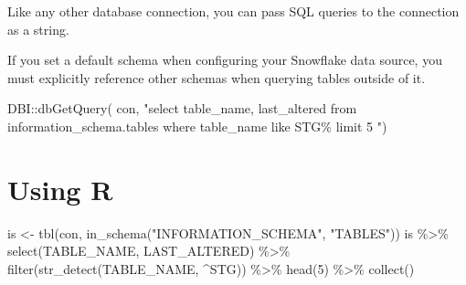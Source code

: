 \documentclass[
  letterpaper,
  DIV=11,
  numbers=noendperiod]{scrreprt}
\newenvironment{Shaded}{\begin{snugshade}}{\end{snugshade}}
\newcommand{\DecValTok}[1]{\textcolor[rgb]{0.68,0.00,0.00}{#1}}
\newcommand{\FunctionTok}[1]{\textcolor[rgb]{0.28,0.35,0.67}{#1}}
\newcommand{\NormalTok}[1]{\textcolor[rgb]{0.00,0.23,0.31}{#1}}
\newcommand{\OtherTok}[1]{\textcolor[rgb]{0.00,0.23,0.31}{#1}}
\newcommand{\SpecialCharTok}[1]{\textcolor[rgb]{0.37,0.37,0.37}{#1}}
\newcommand{\StringTok}[1]{\textcolor[rgb]{0.13,0.47,0.30}{#1}}
\begin{document}
Like any other database connection, you can pass SQL queries to the
connection as a string.

\begin{tcolorbox}[enhanced jigsaw, breakable, coltitle=black, opacitybacktitle=0.6, opacityback=0, leftrule=.75mm, colbacktitle=quarto-callout-warning-color!10!white, toprule=.15mm, colframe=quarto-callout-warning-color-frame, colback=white, left=2mm, bottomrule=.15mm, rightrule=.15mm, bottomtitle=1mm, toptitle=1mm, title=\textcolor{quarto-callout-warning-color}{\faExclamationTriangle}\hspace{0.5em}{Warning}, titlerule=0mm, arc=.35mm]

If you set a default schema when configuring your Snowflake data source,
you must explicitly reference other schemas when querying tables outside
of it.

\end{tcolorbox}

\begin{Shaded}
\begin{Highlighting}[]
\NormalTok{DBI}\SpecialCharTok{::}\FunctionTok{dbGetQuery}\NormalTok{(}
\NormalTok{  con,}
  \StringTok{"select table\_name, last\_altered}
\StringTok{  from information\_schema.tables }
\StringTok{  where table\_name like \textquotesingle{}STG\%\textquotesingle{} limit 5}
\StringTok{  "}\NormalTok{)}
\end{Highlighting}
\end{Shaded}

\section{Using R}\label{using-r}

\begin{Shaded}
\begin{Highlighting}[]
\NormalTok{is }\OtherTok{\textless{}{-}} \FunctionTok{tbl}\NormalTok{(con, }\FunctionTok{in\_schema}\NormalTok{(}\StringTok{"INFORMATION\_SCHEMA"}\NormalTok{, }\StringTok{"TABLES"}\NormalTok{))}
\NormalTok{is }\SpecialCharTok{\%\textgreater{}\%} 
  \FunctionTok{select}\NormalTok{(TABLE\_NAME, LAST\_ALTERED) }\SpecialCharTok{\%\textgreater{}\%} 
  \FunctionTok{filter}\NormalTok{(}\FunctionTok{str\_detect}\NormalTok{(TABLE\_NAME, }\StringTok{\textquotesingle{}\^{}STG\textquotesingle{}}\NormalTok{)) }\SpecialCharTok{\%\textgreater{}\%}
  \FunctionTok{head}\NormalTok{(}\DecValTok{5}\NormalTok{) }\SpecialCharTok{\%\textgreater{}\%} 
  \FunctionTok{collect}\NormalTok{()}
\end{Highlighting}
\end{Shaded}
\end{document}

